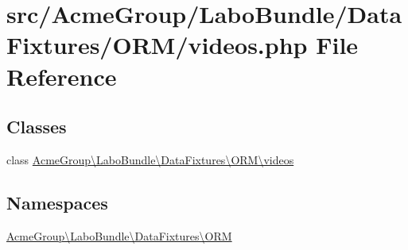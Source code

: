 \hypertarget{videos_8php}{\section{src/\+Acme\+Group/\+Labo\+Bundle/\+Data\+Fixtures/\+O\+R\+M/videos.php File Reference}
\label{videos_8php}
}
\subsection*{Classes}
\begin{DoxyCompactItemize}
\item 
class \hyperlink{class_acme_group_1_1_labo_bundle_1_1_data_fixtures_1_1_o_r_m_1_1videos}{Acme\+Group\textbackslash{}\+Labo\+Bundle\textbackslash{}\+Data\+Fixtures\textbackslash{}\+O\+R\+M\textbackslash{}videos}
\end{DoxyCompactItemize}
\subsection*{Namespaces}
\begin{DoxyCompactItemize}
\item 
 \hyperlink{namespace_acme_group_1_1_labo_bundle_1_1_data_fixtures_1_1_o_r_m}{Acme\+Group\textbackslash{}\+Labo\+Bundle\textbackslash{}\+Data\+Fixtures\textbackslash{}\+O\+R\+M}
\end{DoxyCompactItemize}

